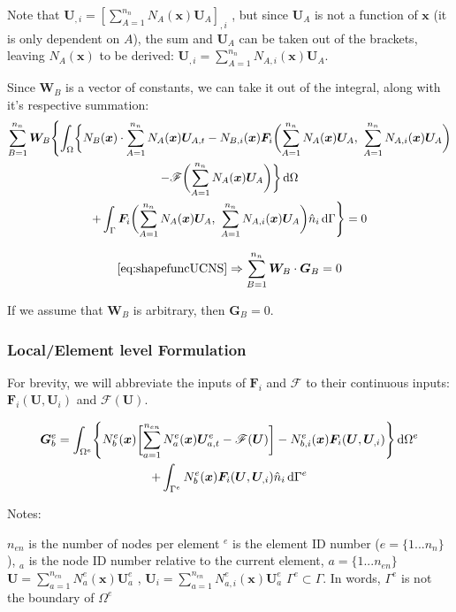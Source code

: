 \documentclass[11pt, letterpaper, twoside]{article}
\renewcommand{\vec}[1]{\bm{#1}}
\newcommand{\U}{\vec{U}}
\newcommand{\G}{\vec{G}}
\newcommand{\F}{\vec{F}}
\newcommand{\W}{\vec{W}}
\newcommand{\x}{\vec{x}}
\newcommand{\NAx}{N_A(\x)}
\newcommand{\NBx}{N_B(\x)}
\newcommand{\NAix}{N_{A,i}(\x)}
\newcommand{\NBix}{N_{B,i}(\x)}
\newcommand{\Neax}{N^e_a(\x)}
\newcommand{\Nebx}{N^e_b(\x)}
\newcommand{\Neaix}{N^e_{a,i}(\x)}
\newcommand{\Nebix}{N^e_{b,i}(\x)}
\newcommand{\sumA}[1]{\sum_{A=1}^{#1}}
\newcommand{\sumB}[1]{\sum_{B=1}^{#1}}
\newcommand{\suma}[1]{\sum_{a=1}^{#1}}
\newcommand{\src}{\vec{\mathscr{F}}}
\begin{document}
            Note that \(\U_{,i} = [\sumA{n_n} \NAx \U_A]_{,i}\) , but since \(\U_A\) is not a function of \(\x\) (it is only dependent on \(A\)), the sum and \(\U_A\) can be taken out of the brackets, leaving \(\NAx\) to be derived: \(\U_{,i} = \sumA{n_n} \NAix \U_A\).

            Since \(\W_B\) is a vector of constants, we can take it out of the integral, along with it's respective summation:
            \begin{multline} \label{eq:shapefuncUCNS}
                \sumB{n_n} \W_B  \Biggl\{\int_\Omega \biggl\{  \NBx  \cdot \sumA{n_n} \NAx \U_{A,t} 
                -  \NBix  \F_i \biggl(\sumA{n_n} \NAx \U_A,\ \sumA{n_n} \NAix \U_A\biggr) \\
                -   \src\biggl(\sumA{n_n} \NAx \U_A \biggr) \biggr\} \dif \Omega \\
                + \int_\Gamma \F_i\biggl(\sumA{n_n} \NAx \U_A,\ \sumA{n_n} \NAix \U_A\biggr) \hat n_i \dif \Gamma \Biggr\} = 0
            \end{multline}

            \begin{equation}
                \cref{eq:shapefuncUCNS} \Rightarrow \sumB{n_n} \W_B \cdot \G_B = 0
            \end{equation}

            If we assume that \(\W_B\) is arbitrary, then \(\G_B=0\).

        \subsubsection{Local/Element level Formulation}
            For brevity, we will abbreviate the inputs of \(\F_i\) and \(\src\) to their continuous inputs: \(\F_i(\U, \U_i)\) and \(\src(\U)\).

            \begin{multline} 
                \G_b^e = \int_{\Omega^e} \Biggl\{ \Nebx \biggl[ \suma{n_{en}} \Neax \U_{a,t}^e - \src(\U) \biggr] - \Nebix \F_i(\U, \U_{,i}) \Biggr\} \dif \Omega^e \\
                + \int_{\Gamma^e} \Nebx \F_i(\U, \U_{,i}) \hat n_i \dif \Gamma^e
            \end{multline}

            Notes:
            \begin{outline}[enumerate]
                \1 \(n_{en}\) is the number of nodes per element
                \1 \(^e\) is the element ID number (\(e = \{1 ... n_n\}\)), 
                \1 \(_a\) is the node ID number relative to the current element, \(a = \{1 ... n_{en}\}\)
                \1 \(\U = \suma{n_{en}} \Neax \U_a^e\) , \(\U_i = \suma{n_{en}} \Neaix \U_a^e\)
                \1 \(\Gamma^e \subset \Gamma \). In words, \(\Gamma^e\) is not the boundary of \(\Omega^e\)
                
            \end{outline}
\end{document}
